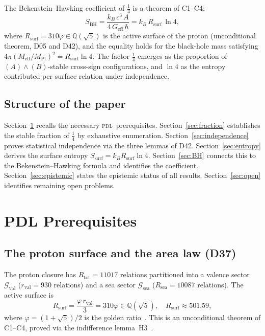 \documentclass[12pt,a4paper]{article}
\newcommand{\hb}{\hbar}
\newcommand{\PDL}{\textsc{pdl}}
\newcommand{\Rsurf}{R_{\mathrm{surf}}}
\newcommand{\Rtot}{R_{\mathrm{tot}}}
\newcommand{\rval}{r_{\mathrm{val}}}
\newcommand{\Rsea}{R_{\mathrm{sea}}}
\newcommand{\Gval}{\mathcal{G}_{\mathrm{val}}}
\newcommand{\Gsea}{\mathcal{G}_{\mathrm{sea}}}
\newcommand{\Ssurf}{S_{\mathrm{surf}}}
\newcommand{\SBH}{S_{\mathrm{BH}}}
\newcommand{\Meff}{M_{\mathrm{eff}}}
\newcommand{\MPl}{M_{\mathrm{Pl}}}
\newcommand{\vp}{\varphi}
\begin{document}
The Bekenstein--Hawking coefficient of $\tfrac{1}{4}$ is a theorem of C1--C4:
\begin{equation}
\SBH = \frac{k_B\,c^3\,A}{4\,G_{\mathrm{eff}}\,\hb}
= k_B\,\Rsurf\,\ln 4,
\label{eq:BH_central}
\end{equation}
where $\Rsurf = 310\vp \in \mathbb{Q}(\sqrt{5})$ is the active surface of the proton (unconditional theorem, D05 and D42), and the equality holds for the black-hole mass satisfying $4\pi(\Meff/\MPl)^2 = \Rsurf\ln 4$. The factor $\tfrac{1}{4}$ emerges as the proportion of $(A)\wedge(B)$-stable cross-sign configurations, and $\ln 4$ as the entropy contributed per surface relation under independence.

\subsection{Structure of the paper}

Section~\ref{sec:prereq} recalls the necessary \PDL\ prerequisites. Section~\ref{sec:fraction} establishes the stable fraction of $\tfrac{1}{4}$ by exhaustive enumeration. Section~\ref{sec:independence} proves statistical independence via the three lemmas of D42. Section~\ref{sec:entropy} derives the surface entropy $\Ssurf = k_B\Rsurf\ln 4$. Section~\ref{sec:BH} connects this to the Bekenstein--Hawking formula and identifies the coefficient. Section~\ref{sec:epistemic} states the epistemic status of all results. Section~\ref{sec:open} identifies remaining open problems.

\section{PDL Prerequisites}
\label{sec:prereq}

\subsection{The proton surface and the area law (D37)}

The proton closure has $\Rtot = 11017$ relations partitioned into a valence sector $\Gval$ ($\rval = 930$ relations) and a sea sector $\Gsea$ ($\Rsea = 10087$ relations). The active surface is
\begin{equation}
\Rsurf = \frac{\vp\,\rval}{3} = 310\vp \in \mathbb{Q}(\sqrt{5}), \quad \Rsurf \approx 501.59,
\label{eq:Rsurf}
\end{equation}
where $\vp = (1+\sqrt{5})/2$ is the golden ratio~\cite{PDL_D05_2026}. This is an unconditional theorem of C1--C4, proved via the indifference lemma~H3~\cite{PDL_D42_2026}.
\end{document}

